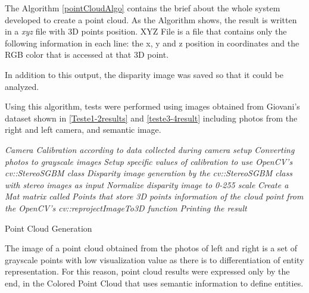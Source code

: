     The Algorithm \autoref{pointCloudAlgo} contains the brief about the whole system developed to create a point cloud. As the Algorithm shows, the result is written in a \textit{xyz} file with 3D points position. XYZ File is a file that contains only the following information in each line: the x, y and z position in coordinates and the RGB color that is accessed at that 3D point. 
    
    In addition to this output, the disparity image was saved so that it could be analyzed.
    
    Using this algorithm, tests were performed using images obtained from Giovani's dataset \cite{giovaniThesis} shown in \autoref{Teste1-2results} and \autoref{teste3-4result} including photos from the right and left camera, and semantic image.

\IncMargin{1em}
\begin{algorithm}
\label{pointCloudAlgo}
\BlankLine
\emph{Camera Calibration according to data collected during camera setup}\;
\emph{Converting photos to grayscale images}\;
\emph{Setup specific values of calibration to use OpenCV's cv::StereoSGBM class}\;
\emph{Disparity image generation by the cv::StereoSGBM class with stereo images as input}\;
\emph{Normalize disparity image to 0-255 scale}\;
\emph{Create a Mat matrix called Points that store 3D points information of the cloud point from the OpenCV's cv::reprojectImageTo3D function}\;    
\emph{Printing the result}\;
\caption{Point Cloud Generation}\label{algo_disjdecomp}
\end{algorithm}\DecMargin{1em}

    The image of a point cloud obtained from the photos of left and right is a set of grayscale points with low visualization value as there is to differentiation of entity representation. For this reason, point cloud results were expressed only by the end, in the Colored Point Cloud that uses semantic information to define entities.
    
